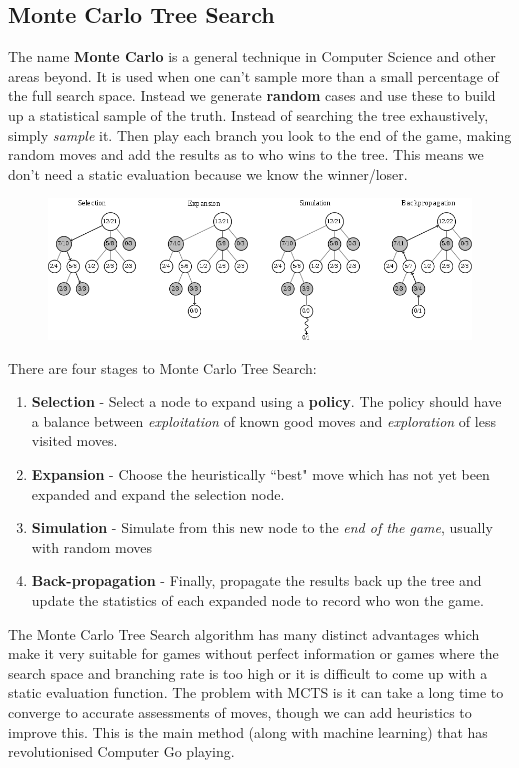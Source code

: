 \documentclass{article}
\begin{document}
\subsection{Monte Carlo Tree Search}
The name \textbf{Monte Carlo} is a general technique in Computer Science and other areas beyond. It is used when one can't sample more than a small percentage of the full search space. Instead we generate \textbf{random} cases and use these to build up a statistical sample of the truth. Instead of searching the tree exhaustively, simply \textit{sample} it. Then play each branch you look to the end of the game, making random moves and add the results as to who wins to the tree. This means we don't need a static evaluation because we know the winner/loser.
\begin{figure}[H]
\centering
\includegraphics[width=1\textwidth, keepaspectratio]{imgs/mcts.png}
\end{figure}
There are four stages to Monte Carlo Tree Search:
\begin{enumerate}
\item \textbf{Selection} - Select a node to expand using a \textbf{policy}. The policy should have a balance between \textit{exploitation} of known good moves and \textit{exploration} of less visited moves.
\item \textbf{Expansion} - Choose the heuristically ``best" move which has not yet been expanded and expand the selection node. 
\item \textbf{Simulation} - Simulate from this new node to the \textit{end of the game}, usually with random moves
\item \textbf{Back-propagation} - Finally, propagate the results back up the tree and update the statistics of each expanded node to record who won the game. 
\end{enumerate}
The Monte Carlo Tree Search algorithm has many distinct advantages which make it very suitable for games without perfect information or games where the search space and branching rate is too high or it is difficult to come up with a static evaluation function. The problem with MCTS is it can take a long time to converge to accurate assessments of moves, though we can add heuristics to improve this. This is the main method (along with machine learning) that has revolutionised Computer Go playing.
\end{document}
